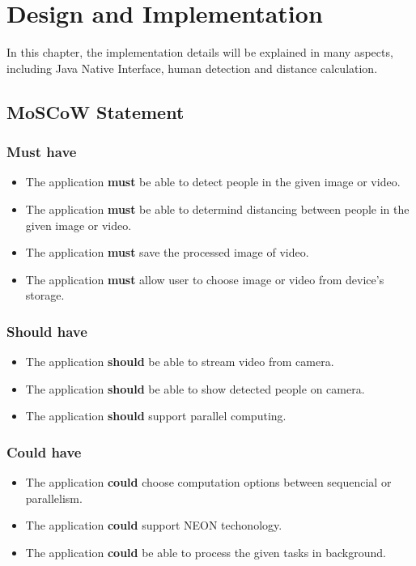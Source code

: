 \chapter{Design and Implementation}\label{implement}

    In this chapter, the implementation details will be explained in many aspects, including Java Native Interface,
    human detection and distance calculation.

    \section{MoSCoW Statement}

        \subsection{Must have}
            \begin{itemize}
                \setlength\itemsep{1em}
                \item The application \textbf{must} be able to detect people in the given image or video.
                \item The application \textbf{must} be able to determind distancing between people in the given image or video.
                \item The application \textbf{must} save the processed image of video.
                \item The application \textbf{must} allow user to choose image or video from device's storage.
            \end{itemize}

        \subsection{Should have}
            \begin{itemize}
                \item The application \textbf{should} be able to stream video from camera.
                \item The application \textbf{should} be able to show detected people on camera.
                \item The application \textbf{should} support parallel computing.
            \end{itemize}

        \subsection{Could have}
            \begin{itemize}
                \item The application \textbf{could} choose computation options between sequencial or parallelism.
                \item The application \textbf{could} support NEON techonology.
                \item The application \textbf{could} be able to process the given tasks in background.
            \end{itemize}
